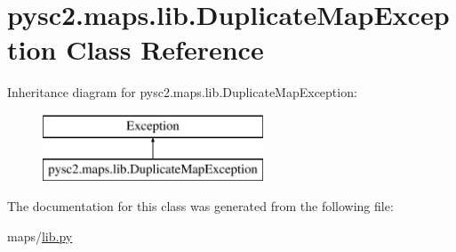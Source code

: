 \hypertarget{classpysc2_1_1maps_1_1lib_1_1_duplicate_map_exception}{}\section{pysc2.\+maps.\+lib.\+Duplicate\+Map\+Exception Class Reference}
\label{classpysc2_1_1maps_1_1lib_1_1_duplicate_map_exception}
Inheritance diagram for pysc2.\+maps.\+lib.\+Duplicate\+Map\+Exception\+:\begin{figure}[H]
\begin{center}
\leavevmode
\includegraphics[height=2.000000cm]{classpysc2_1_1maps_1_1lib_1_1_duplicate_map_exception}
\end{center}
\end{figure}


The documentation for this class was generated from the following file\+:\begin{DoxyCompactItemize}
\item 
maps/\mbox{\hyperlink{maps_2lib_8py}{lib.\+py}}\end{DoxyCompactItemize}
